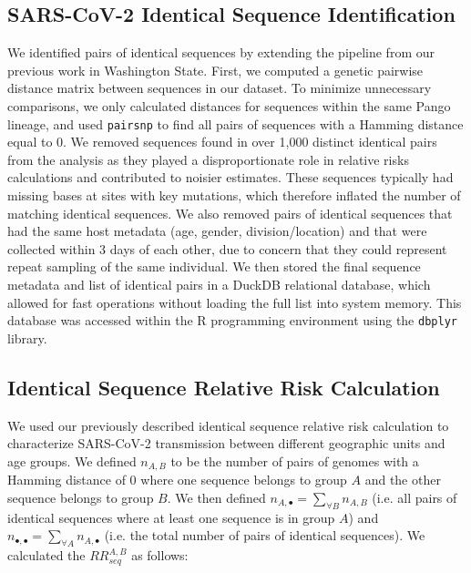 \documentclass[11pt, letterpaper, oneside]{article}
\begin{document}
\subsection{SARS-CoV-2 Identical Sequence Identification}
We identified pairs of identical sequences by extending the pipeline from our previous work in Washington State.\autocite{tran-kiemFinescalePatternsSARSCoV22025a}
First, we computed a genetic pairwise distance matrix between sequences in our dataset.
To minimize unnecessary comparisons, we only calculated distances for sequences within the same Pango lineage, and used \texttt{pairsnp} to find all pairs of sequences with a Hamming distance equal to 0.\autocite{aksamentovNextcladeCladeAssignment2021,tonkin-hillGtonkinhillPairsnp2025}
We removed sequences found in over 1,000 distinct identical pairs from the analysis as they played a disproportionate role in relative risks calculations and contributed to noisier estimates. 
These sequences typically had missing bases at sites with key mutations, which therefore inflated the number of matching identical sequences.
We also removed pairs of identical sequences that had the same host metadata (age, gender, division/location) and that were collected within 3 days of each other, due to concern that they could represent repeat sampling of the same individual.
We then stored the final sequence metadata and list of identical pairs in a DuckDB relational database, which allowed for fast operations without loading the full list into system memory.
This database was accessed within the R programming environment using the \texttt{dbplyr} library.\autocite{rcoreteamLanguageEnvironmentStatistical2025,wickhamDbplyrDplyrBack2025}

\subsection{Identical Sequence Relative Risk Calculation}
We used our previously described identical sequence relative risk calculation to characterize SARS-CoV-2 transmission between different geographic units and age groups.\autocite{tran-kiemFinescalePatternsSARSCoV22025a}
We defined $n_{A,B}$ to be the number of pairs of genomes with a Hamming distance of 0 where one sequence belongs to group $A$ and the other sequence belongs to group $B$.
We then defined $n_{A,\bullet}= \sum_{\forall B}n_{A,B}$ (i.e. all pairs of identical sequences where at least one sequence is in group $A$) and $n_{\bullet,\bullet} = \sum_{\forall A}n_{A,\bullet}$ (i.e. the total number of pairs of identical sequences).
We calculated the $RR_{seq}^{A,B}$ as follows:
\end{document}
